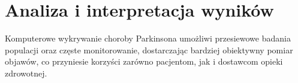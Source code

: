 \chapter{Analiza i interpretacja wyników}



Komputerowe wykrywanie choroby Parkinsona umożliwi przesiewowe badania populacji oraz częste monitorowanie, dostarczając bardziej obiektywny pomiar objawów, co przyniesie korzyści zarówno pacjentom, jak i dostawcom opieki zdrowotnej.